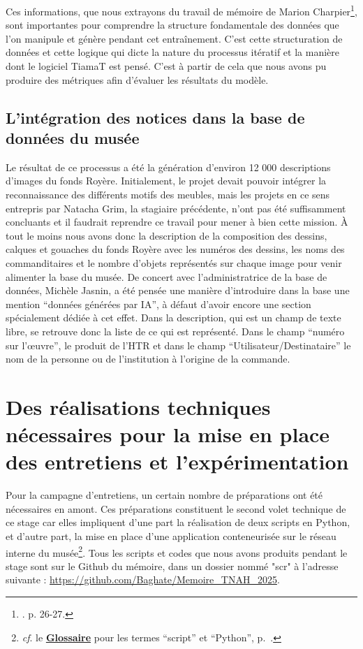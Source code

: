 Ces informations, que nous extrayons du travail de mémoire de Marion Charpier\footnote{\cite{charpier_computer_2023}. p. 26-27.}, sont importantes pour comprendre la structure fondamentale des données que l'on manipule et génère pendant cet entraînement. C'est cette structuration de données et cette logique qui dicte la nature du processus itératif et la manière dont le logiciel TiamaT est pensé. C'est à partir de cela que nous avons pu produire des métriques afin d'évaluer les résultats du modèle. \\[1cm]

\subsection{L'intégration des notices dans la base de données du musée}

Le résultat de ce processus a été la génération d'environ 12 000 descriptions d'images du fonds Royère. Initialement, le projet devait pouvoir intégrer la reconnaissance des différents motifs des meubles, mais les projets en ce sens entrepris par Natacha Grim, la stagiaire précédente, n'ont pas été suffisamment concluants et il faudrait reprendre ce travail pour mener à bien cette mission. À tout le moins nous avons donc la description de la composition des dessins, calques et gouaches du fonds Royère avec les numéros des dessins, les noms des commanditaires et le nombre d'objets représentés sur chaque image pour venir alimenter la base du musée. De concert avec l'administratrice de la base de données, Michèle Jasnin, a été pensée une manière d'introduire dans la base une mention \enquote{données générées par IA}, à défaut d'avoir encore une section spécialement dédiée à cet effet. Dans la description, qui est un champ de texte libre, se retrouve donc la liste de ce qui est représenté. Dans le champ \enquote{numéro sur l’œuvre}, le produit de l'HTR et dans le champ \enquote{Utilisateur/Destinataire} le nom de la personne ou de l'institution à l'origine de la commande.

\section{Des réalisations techniques nécessaires pour la mise en place des entretiens et l'expérimentation}

Pour la campagne d'entretiens, un certain nombre de préparations ont été nécessaires en amont. Ces préparations constituent le second volet technique de ce stage car elles impliquent d'une part la réalisation de deux scripts en Python, et d'autre part, la mise en place d'une application conteneurisée sur le réseau interne du musée\footnote{\textit{cf}. le \textbf{\hyperref[sec:Glossaire]{Glossaire}} pour les termes \enquote{script} et \enquote{Python}, p.~\pageref{sec:Glossaire}.}. Tous les scripts et codes que nous avons produits pendant le stage sont sur le Github du mémoire, dans un dossier nommé "scr" à l'adresse suivante : \url{https://github.com/Baghate/Memoire_TNAH_2025}.

